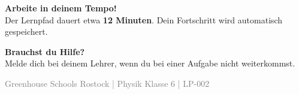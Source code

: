 \documentclass[11pt, a4paper]{article}
\begin{document}
\vspace{1em}


\begin{tcolorbox}[
    colback=erfolg!10,
    colframe=erfolg,
    boxrule=1.5pt,
    arc=0pt
]
\textbf{\textcolor{erfolg}{Arbeite in deinem Tempo!}}\\[0.3em]
Der Lernpfad dauert etwa \textbf{12 Minuten}. Dein Fortschritt wird automatisch gespeichert.
\end{tcolorbox}

\vspace{1em}


\begin{tcolorbox}[
    colback=warnung-hell,
    colframe=warnung,
    boxrule=1.5pt,
    arc=0pt
]
\textbf{\textcolor{warnung}{Brauchst du Hilfe?}}\\[0.3em]
Melde dich bei deinem Lehrer, wenn du bei einer Aufgabe nicht weiterkommst.
\end{tcolorbox}

\vfill


\begin{center}
\textcolor{gray}{\small Greenhouse Schools Rostock | Physik Klasse 6 | LP-002}
\end{center}
\end{document}
